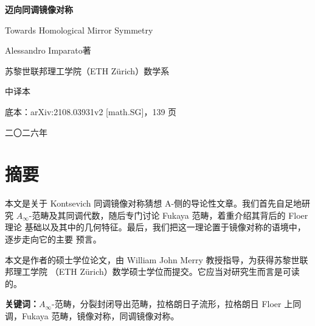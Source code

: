 
\begin{titlepage}
  \centering
  \vspace*{2.2cm}
  {\Huge\bfseries 迈向同调镜像对称\par}
  \vspace{0.9cm}
  {\Large Towards Homological Mirror Symmetry\par}
  \vspace{2.2cm}
  {\large Alessandro Imparato\quad 著\par}
  \vspace{0.4cm}
  {\large 苏黎世联邦理工学院（ETH Zürich）数学系\par}
  \vspace{2.6cm}
  {\large 中译本\par}
  \vspace{0.3cm}
  {\normalsize 底本：arXiv:2108.03931v2 [math.SG]，139 页\par}
  \vfill
  {\normalsize 二〇二六年\par}
\end{titlepage}

\pagestyle{plain}

\section*{摘要}

本文是关于 Kontsevich 同调镜像对称猜想 A-侧的导论性文章。我们首先自足地研究
$A_\infty$-范畴及其同调代数，随后专门讨论 Fukaya 范畴，着重介绍其背后的 Floer 理论
基础以及其中的几何特征。最后，我们把这一理论置于镜像对称的语境中，逐步走向它的主要
预言。

本文是作者的硕士学位论文，由 William John Merry 教授指导，为获得苏黎世联邦理工学院
（ETH Zürich）数学硕士学位而提交。它应当对研究生而言是可读的。

\vspace{0.8em}
\noindent\textbf{关键词：}$A_\infty$-范畴，分裂封闭导出范畴，拉格朗日子流形，拉格朗日
Floer 上同调，Fukaya 范畴，镜像对称，同调镜像对称。

